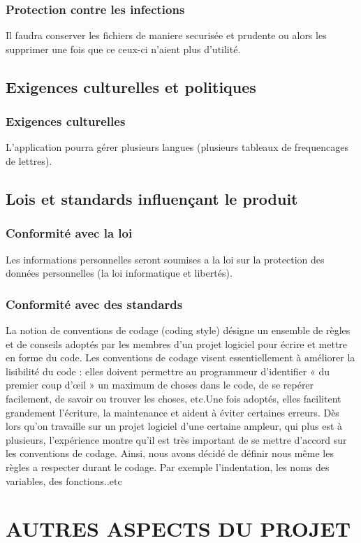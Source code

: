 \documentclass[a4]{article}
\begin{document}
			\subsubsection {Protection contre les infections}
				Il faudra conserver les fichiers de maniere securisée et prudente ou alors les supprimer une 					fois que ce ceux-ci n'aient plus d'utilité.
		\subsection{Exigences culturelles et politiques}
			\subsubsection {Exigences culturelles}
				L'application pourra gérer plusieurs langues (plusieurs tableaux de frequencages de lettres).
		\subsection{Lois et standards influençant le produit}
			\subsubsection {Conformité avec la loi}
				Les informations personnelles seront soumises a la loi sur la protection des données
				personnelles (la loi informatique et libertés).
			\subsubsection {Conformité avec des standards}
La notion de conventions de codage (coding style) désigne un ensemble de règles et de conseils 
adoptés par les membres d’un projet logiciel pour écrire et mettre en forme du code.
Les conventions de codage visent essentiellement à améliorer la lisibilité du code : elles doivent 
permettre au programmeur d’identifier « du premier coup d’œil » un maximum de choses dans 
le  code, de se repérer facilement, de savoir ou trouver les choses, etc.Une fois adoptés, elles
facilitent grandement l’écriture, la maintenance et aident à éviter certaines erreurs.
Dès lors qu’on travaille sur un projet logiciel d’une certaine ampleur, qui plus est à
plusieurs, l’expérience montre qu’il est très important de se mettre d’accord sur les
conventions de codage. Ainsi, nous avons décidé de définir nous même les règles a respecter durant le codage. Par exemple l'indentation, les noms des variables, des fonctions..etc
\section{AUTRES ASPECTS DU PROJET}
\end{document}
